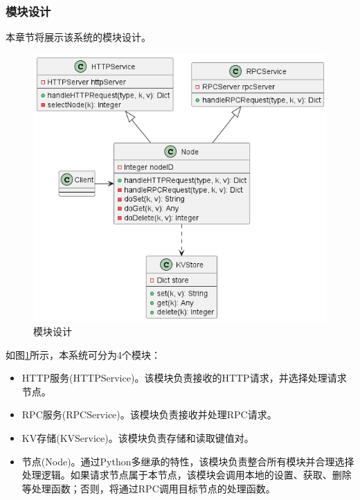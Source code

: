 \subsubsection{模块设计}

本章节将展示该系统的模块设计。

\begin{figure}[H]
    \centering
    \includegraphics[width=0.8\linewidth]{examples/模块设计.png}
    \caption{模块设计}
    \label{fig:modules}
\end{figure}

如图\ref{fig:modules}所示，本系统可分为4个模块：
\begin{itemize}
    \item HTTP服务(HTTPService)。该模块负责接收的HTTP请求，并选择处理请求节点。
    \item RPC服务(RPCService)。该模块负责接收并处理RPC请求。
    \item KV存储(KVService)。该模块负责存储和读取键值对。
    \item 节点(Node)。通过Python多继承的特性，该模块负责整合所有模块并合理选择处理逻辑。如果请求节点属于本节点，该模块会调用本地的设置、获取、删除等处理函数；否则，将通过RPC调用目标节点的处理函数。
\end{itemize}